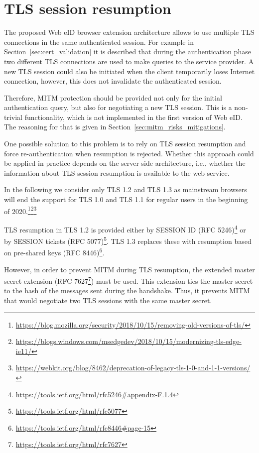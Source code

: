\section{TLS session resumption}
\label{sec:tls_resumption}
The proposed Web eID browser extension architecture allows to use multiple TLS connections in the same authenticated session. For example in Section~\ref{sec:cert_validation} it is described that during the authentication phase two different TLS connections are used to make queries to the service provider. A new TLS session could also be initiated when the client temporarily loses Internet connection, however, this does not invalidate the authenticated session.

Therefore, MITM protection should be provided not only for the initial authentication query, but also for negotiating a new TLS session. This is a non-trivial functionality, which is not implemented in the first version of Web eID. The reasoning for that is given in Section~\ref{sec:mitm_risks_mitigations}.

One possible solution to this problem is to rely on TLS session resumption and force re-authentication when resumption is rejected. Whether this approach could be applied in practice depends on the server side architecture, i.e., whether the information about TLS session resumption is available to the web service.

In the following we consider only TLS 1.2 and TLS 1.3 as mainstream browsers will end the support for TLS 1.0 and TLS 1.1 for regular users in the beginning of 2020.\footnote{\url{https://blog.mozilla.org/security/2018/10/15/removing-old-versions-of-tls/}}\footnote{\url{https://blogs.windows.com/msedgedev/2018/10/15/modernizing-tls-edge-ie11/}}\footnote{\url{https://webkit.org/blog/8462/deprecation-of-legacy-tls-1-0-and-1-1-versions/}}

TLS resumption in TLS 1.2 is provided either by SESSION ID (RFC 5246)\footnote{\url{https://tools.ietf.org/html/rfc5246\#appendix-F.1.4}} or by SESSION tickets (RFC 5077)\footnote{\url{https://tools.ietf.org/html/rfc5077}}. TLS 1.3 replaces these with resumption based on pre-shared keys (RFC 8446)\footnote{\url{https://tools.ietf.org/html/rfc8446\#page-15}}.

However, in order to prevent MITM during TLS resumption, the extended master secret extension (RFC 7627\footnote{\url{https://tools.ietf.org/html/rfc7627}}) must be used. This extension ties the master secret to the hash of the messages sent during the handshake. Thus, it prevents MITM that would negotiate two TLS sessions with the same master secret.
